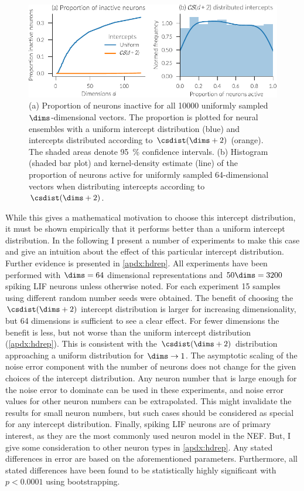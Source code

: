 \begin{figure}
    \centering
    \includegraphics{figures/act-cs}
    \caption[Proportion of inactive neurons and its distribution]{(a) Proportion of neurons inactive for all \num{10000} uniformly sampled $\dims$-dimensional vectors. The proportion is plotted for neural ensembles with a uniform intercept distribution (blue) and intercepts distributed according to $\csdist(\dims + 2)$ (orange). The shaded areas denote \SI{95}{\percent} confidence intervals. (b) Histogram (shaded bar plot) and kernel-density estimate (line) of the proportion of neurons active for uniformly sampled 64-dimensional vectors when distributing intercepts according to $\csdist(\dims + 2)$.}\label{fig:act-cs}
\end{figure}

While this gives a mathematical motivation to choose this intercept distribution, it must be shown empirically that it performs better than a uniform intercept distribution.
In the following I present a number of experiments to make this case and give an intuition about the effect of this particular intercept distribution.
Further evidence is presented in \cref{apdx:hdrep}.
All experiments have been performed with $\dims = 64$ dimensional representations and $50 \dims = 3200$ spiking LIF neurons unless otherwise noted.
For each experiment 15 samples using different random number seeds were obtained.
The benefit of choosing the $\csdist(\dims + 2)$ intercept distribution is larger for increasing dimensionality, but 64 dimensions is sufficient to see a clear effect.
For fewer dimensions the benefit is less, but not worse than the uniform intercept distribution (\cref{apdx:hdrep}).
This is consistent with the $\csdist(\dims + 2)$ distribution approaching a uniform distribution for $\dims \rightarrow 1$.
The asymptotic scaling of the noise error component with the number of neurons does not change for the given choices of the intercept distribution.
Any neuron number that is large enough for the noise error to dominate can be used in these experiments, and noise error values for other neuron numbers can be extrapolated.
This might invalidate the results for small neuron numbers, but such cases should be considered as special for any intercept distribution.
Finally, spiking LIF neurons are of primary interest, as they are the most commonly used neuron model in the NEF\@.
But, I give some consideration to other neuron types in \cref{apdx:hdrep}.
Any stated differences in error are based on the aforementioned parameters.
Furthermore, all stated differences have been found to be statistically highly significant with $p < 0.0001$ using bootstrapping.

